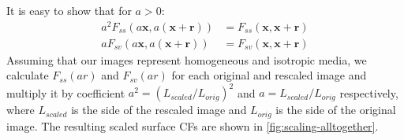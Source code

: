 \documentclass[reprint,amsmath,amssymb,aps,pre,showkeys,showpacs]{revtex4-1}
\begin{document}
It is easy to show that for $a > 0$:
\begin{align}
  a^2 F_{ss}(a \mathbf{x}, a(\mathbf{x} + \mathbf{r})) &= F_{ss}(\mathbf{x},
  \mathbf{x} + \mathbf{r}) \label{eq:scale-ss} \\
  a F_{sv}(a \mathbf{x}, a(\mathbf{x} + \mathbf{r})) &= F_{sv}(\mathbf{x},
  \mathbf{x} + \mathbf{r}) \label{eq:scale-sv}
\end{align}
Assuming that our images represent homogeneous and isotropic media, we calculate
$F_{ss}(ar)$ and $F_{sv}(ar)$ for each original and rescaled image and multiply
it by coefficient $a^2 = (L_{scaled}/L_{orig})^2$ and $a = L_{scaled}/L_{orig}$
respectively, where $L_{scaled}$ is the side of the rescaled image and
$L_{orig}$ is the side of the original image. The resulting scaled surface CFs
are shown in \cref{fig:scaling-alltogether}.
\end{document}
